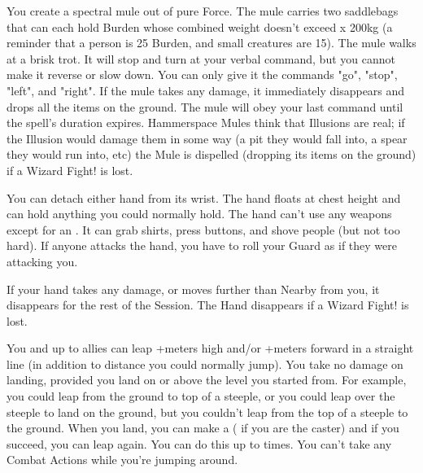 \WIZARDRY[
  Name=Hammerspace Mule,
  Link=secrets-hammerspace-mule,
  Alignment=Force,
  Save=N,
  Duration=Session,
  Counter=\mylink{Illusion}{secrets-illusion} ,
  Keywords=Hammerspace,
  Target=Close
]

You create a spectral mule out of pure Force. The mule carries two  saddlebags that can each hold \SUMDICE Burden whose combined weight doesn't exceed \DICE x 200kg (a reminder that a person is 25 Burden, and small creatures are 15).  The mule walks at a brisk trot.  It will stop and turn at your verbal command, but you cannot make it reverse or slow down. You can only give it the commands "go", "stop", "left", and "right". If the mule takes any damage, it immediately disappears and drops all the items on the ground.  The mule will obey your last command until the spell's duration expires.  Hammerspace Mules think that Illusions are real; if the Illusion would damage them in some way (a pit they would fall into, a spear they would run into, etc) the Mule is dispelled (dropping its items on the ground) if a Wizard Fight! is lost.


\WIZARDRY[
  Name=Helping Hand,
  Link=secrets-helping-hand,
  Alignment=Biomancy,
  Save=N,
  Duration=Concentration,
  Counter=\mylink{Web}{secrets-web} ,
  Keywords=None,
  Target=Self
]



You can detach either hand from its wrist.  The hand floats at chest height and can hold anything you could normally hold.  The hand can't use any weapons except for an .  It can grab shirts, press buttons, and shove people (but not too hard).  If anyone attacks the hand, you have to roll your Guard as if they were attacking you. 
 
If your hand takes any damage, or moves further than Nearby from you, it disappears for the rest of the Session. The Hand disappears if a Wizard Fight! is lost.

\WIZARDRY[
  Name=Heroic Leap,
  Link=secrets-heroic-leap,
  Alignment=Biomancy,
  Save=N,
  Duration=0,
  Counter=None ,
  Keywords=None,
  Target=Self or Close Ally
]

You and up to  allies can leap +\SUMDICE meters high and/or +\SUMDICE meters forward in a straight line (in addition to distance you could normally jump).  You take no damage on landing, provided you land on or above the level you started from. For example, you could leap from the ground to top of a steeple, or you could leap over the steeple to land on the ground, but you couldn't leap from the top of a steeple to the ground.  When you land, you can make a \RSTRY{\DEX} (\RSTRY{\INT} if you are the caster) and if you succeed, you can leap again. You can do this up to \DICE times.  You can't take any Combat Actions while you're jumping around.

